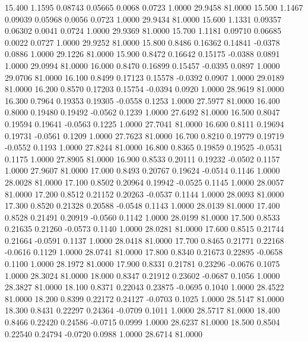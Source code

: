   15.400   1.1595   0.08743   0.05665   0.0068   0.0723   1.0000  29.9458  81.0000
  15.500   1.1467   0.09039   0.05968   0.0056   0.0723   1.0000  29.9434  81.0000
  15.600   1.1331   0.09357   0.06302   0.0041   0.0724   1.0000  29.9369  81.0000
  15.700   1.1181   0.09710   0.06685   0.0022   0.0727   1.0000  29.9252  81.0000
  15.800   0.8486   0.16362   0.14841  -0.0378   0.0886   1.0000  29.1226  81.0000
  15.900   0.8472   0.16642   0.15175  -0.0388   0.0891   1.0000  29.0994  81.0000
  16.000   0.8470   0.16899   0.15457  -0.0395   0.0897   1.0000  29.0706  81.0000
  16.100   0.8499   0.17123   0.15578  -0.0392   0.0907   1.0000  29.0189  81.0000
  16.200   0.8570   0.17203   0.15754  -0.0394   0.0920   1.0000  28.9619  81.0000
  16.300   0.7964   0.19353   0.19305  -0.0558   0.1253   1.0000  27.5977  81.0000
  16.400   0.8000   0.19480   0.19492  -0.0562   0.1239   1.0000  27.6492  81.0000
  16.500   0.8047   0.19594   0.19641  -0.0563   0.1225   1.0000  27.7041  81.0000
  16.600   0.8111   0.19694   0.19731  -0.0561   0.1209   1.0000  27.7623  81.0000
  16.700   0.8210   0.19779   0.19719  -0.0552   0.1193   1.0000  27.8244  81.0000
  16.800   0.8365   0.19859   0.19525  -0.0531   0.1175   1.0000  27.8905  81.0000
  16.900   0.8533   0.20111   0.19232  -0.0502   0.1157   1.0000  27.9607  81.0000
  17.000   0.8493   0.20767   0.19624  -0.0514   0.1146   1.0000  28.0028  81.0000
  17.100   0.8502   0.20964   0.19942  -0.0525   0.1145   1.0000  28.0057  81.0000
  17.200   0.8512   0.21152   0.20263  -0.0537   0.1144   1.0000  28.0093  81.0000
  17.300   0.8520   0.21328   0.20588  -0.0548   0.1143   1.0000  28.0139  81.0000
  17.400   0.8528   0.21491   0.20919  -0.0560   0.1142   1.0000  28.0199  81.0000
  17.500   0.8533   0.21635   0.21260  -0.0573   0.1140   1.0000  28.0281  81.0000
  17.600   0.8515   0.21744   0.21664  -0.0591   0.1137   1.0000  28.0418  81.0000
  17.700   0.8465   0.21771   0.22168  -0.0616   0.1129   1.0000  28.0741  81.0000
  17.800   0.8340   0.21673   0.22895  -0.0658   0.1100   1.0000  28.1972  81.0000
  17.900   0.8331   0.21781   0.23296  -0.0676   0.1075   1.0000  28.3024  81.0000
  18.000   0.8347   0.21912   0.23602  -0.0687   0.1056   1.0000  28.3827  81.0000
  18.100   0.8371   0.22043   0.23875  -0.0695   0.1040   1.0000  28.4522  81.0000
  18.200   0.8399   0.22172   0.24127  -0.0703   0.1025   1.0000  28.5147  81.0000
  18.300   0.8431   0.22297   0.24364  -0.0709   0.1011   1.0000  28.5717  81.0000
  18.400   0.8466   0.22420   0.24586  -0.0715   0.0999   1.0000  28.6237  81.0000
  18.500   0.8504   0.22540   0.24794  -0.0720   0.0988   1.0000  28.6714  81.0000
